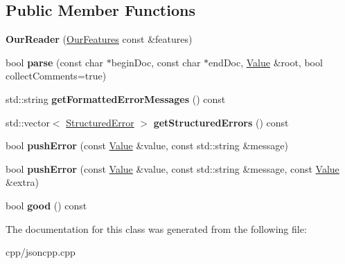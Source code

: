 \subsection*{Public Member Functions}
\begin{DoxyCompactItemize}
\item 
\mbox{\label{class_json_1_1_our_reader_a48a850914b9c8d7781be172930c478e5}} 
{\bfseries Our\+Reader} (\hyperlink{class_json_1_1_our_features}{Our\+Features} const \&features)
\item 
\mbox{\label{class_json_1_1_our_reader_aba4f8749aab7f02ec17f107e392caf80}} 
bool {\bfseries parse} (const char $\ast$begin\+Doc, const char $\ast$end\+Doc, \hyperlink{class_json_1_1_value}{Value} \&root, bool collect\+Comments=true)
\item 
\mbox{\label{class_json_1_1_our_reader_a00407481fa5910e46ea157bc6b7dc95f}} 
std\+::string {\bfseries get\+Formatted\+Error\+Messages} () const
\item 
\mbox{\label{class_json_1_1_our_reader_a0eb2420a6bef89a3f3256191e6e3de6d}} 
std\+::vector$<$ \hyperlink{struct_json_1_1_our_reader_1_1_structured_error}{Structured\+Error} $>$ {\bfseries get\+Structured\+Errors} () const
\item 
\mbox{\label{class_json_1_1_our_reader_aef7aa4ca22ffaa38c401b16951d20e1e}} 
bool {\bfseries push\+Error} (const \hyperlink{class_json_1_1_value}{Value} \&value, const std\+::string \&message)
\item 
\mbox{\label{class_json_1_1_our_reader_ad43315cbb0d6804e3b7177e84a1ec53d}} 
bool {\bfseries push\+Error} (const \hyperlink{class_json_1_1_value}{Value} \&value, const std\+::string \&message, const \hyperlink{class_json_1_1_value}{Value} \&extra)
\item 
\mbox{\label{class_json_1_1_our_reader_a63c7d874fa379397e0a5fa65f0843845}} 
bool {\bfseries good} () const
\end{DoxyCompactItemize}


The documentation for this class was generated from the following file\+:\begin{DoxyCompactItemize}
\item 
cpp/jsoncpp.\+cpp\end{DoxyCompactItemize}
